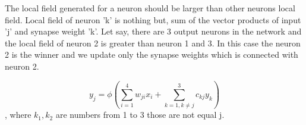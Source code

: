 \documentclass[12pt]{article}
\begin{document}
The local field generated for a neuron should be larger than other neurons local field.
Local field of neuron 'k' is nothing but, sum of the vector products of input 'j' and synapse weight 'k'.  
Let say, there are 3 output neurons in the network and the local field of neuron 2 is greater than neuron 1 and 3.
In this case the neuron 2 is the winner and we update only the synapse weights which is connected with neuron 2.

$$y_j = \phi(\sum_{i=1}^{4} w_{ji}x_i  + \sum_{k=1, k \neq j}^{3} c_{kj}y_k)$$, where $k_1, k_2$ are numbers from 1 to 3 those are not equal j.
\end{document}
